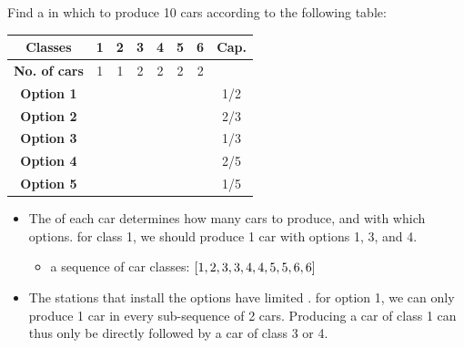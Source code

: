 \documentclass{cons-beamer}
\begin{document}
\newcommand{\yesOption}{\checkmark}
\newcommand{\noOption}{}
\begin{frame}
  \begin{example}

    \begin{center}
      Find a  in which to produce 10 cars according to the following table:

      \begin{tabular}{|c|c|c|c|c|c|c|c|}
        \hline
        \textbf{Classes}     & \textbf{1} & \textbf{2} & \textbf{3} & \textbf{4} & \textbf{5} & \textbf{6} & \textbf{Cap.} \\
        \hline
        \textbf{No. of cars} & 1          & 1          & 2 & 2          & 2          & 2          &                   \\
        \hline
        \textbf{Option 1}    & \yesOption& \yesOption          & \noOption & \noOption          & \yesOption          & \yesOption          & 1/2               \\
        \hline
        \textbf{Option 2}    & \noOption& \noOption          & \yesOption & \yesOption          & \noOption          & \yesOption          & 2/3               \\
        \hline
        \textbf{Option 3}    & \yesOption& \noOption          & \noOption & \noOption          & \yesOption          & \noOption          & 1/3               \\
        \hline
        \textbf{Option 4}    & \yesOption& \yesOption          & \noOption & \yesOption          & \noOption          & \noOption          & 2/5               \\
        \hline
        \textbf{Option 5}    & \noOption& \noOption          & \yesOption & \noOption          & \noOption          & \noOption          & 1/5               \\
        \hline
      \end{tabular}
    \end{center}

    \begin{itemize}
      \item The  of each car determines how many cars to produce, and with which options. \Eg for class 1, we should produce 1 car with options 1, 3, and 4.
        \begin{itemize}
          \item \Eg a sequence of car classes: $[1,2,3,3,4,4,5,5,6,6]$
        \end{itemize}
      \item The stations that install the options have limited . \Eg for option 1, we can only produce 1 car in every sub-sequence of 2 cars. Producing a car of class 1 can thus only be directly followed by a car of class 3 or 4.
    \end{itemize}


\end{example}
\end{frame}
\end{document}
